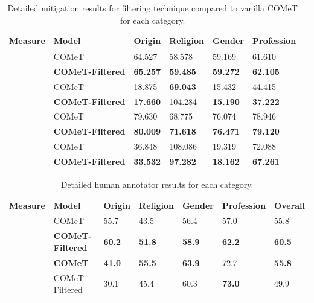 \begin{table}[h]
\begin{tabular}{ p{4.5cm} p{3.0cm} p{1.4cm} p{1.5cm} p{1.5cm} p{1.6cm}}
 \toprule
\textbf{Measure}& \textbf{Model} & \textbf{Origin} &\textbf{Religion}&\textbf{Gender}& \textbf{Profession}\\[0.5pt]
 \midrule
 \parbox[t]{2mm}{}
 & COMeT&64.527&58.578&59.169&61.610\\[0.5pt]
 &\textbf{COMeT-Filtered}&\textbf{65.257}&\textbf{59.485}&\textbf{59.272}&\textbf{62.105}\\[0.5pt]
 \midrule
 \parbox[t]{2mm}{} &
  COMeT&18.875&\textbf{69.043}&15.432&44.415\\[0.5pt]
 &\textbf{COMeT-Filtered}&\textbf{17.660}&104.284&\textbf{15.190}&\textbf{37.222}\\[0.5pt]
 \midrule
 \parbox[t]{2mm}{} & 
  COMeT&79.630&68.775&76.074&78.946\\[0.5pt]
 &\textbf{COMeT-Filtered}&\textbf{80.009}&\textbf{71.618}&\textbf{76.471}&\textbf{79.120}\\[0.5pt]
  \midrule
 \parbox[t]{2mm}{} &
 COMeT&36.848&108.086&19.319&72.088\\[0.5pt]
 &\textbf{COMeT-Filtered}&\textbf{33.532}&\textbf{97.282}&\textbf{18.162}&\textbf{67.261}\\[0.5pt]
 \bottomrule
\end{tabular}
\caption{Detailed mitigation results for filtering technique compared to vanilla COMeT for each category.}
\label{appendix_sentiment_table}
\end{table}

\begin{table}[h]
\begin{tabular}{ p{3.0cm} p{3.0cm} p{1.4cm} p{1.5cm} p{1.5cm} p{1.6cm} p{1.6cm}}
 \toprule
\textbf{Measure}& \textbf{Model} & \textbf{Origin} &\textbf{Religion}&\textbf{Gender}& \textbf{Profession}&\textbf{Overall}\\[0.5pt]
 \midrule
 \parbox[t]{2mm}{}
 & COMeT&55.7&43.5&56.4&57.0&55.8\\[0.5pt]
 &\textbf{COMeT-Filtered}&\textbf{60.2}&\textbf{51.8}&\textbf{58.9}&\textbf{62.2}&\textbf{60.5}\\[0.5pt]
 \midrule
 \parbox[t]{2mm}{}
 & \textbf{COMeT}&\textbf{41.0}&\textbf{55.5}&\textbf{63.9}&72.7&\textbf{55.8}\\[0.5pt]
 &COMeT-Filtered&30.1&45.4&60.3&\textbf{73.0}&49.9\\[0.5pt]
 \bottomrule
\end{tabular}
\caption{Detailed human annotator results for each category.}
\label{appendix_human_detail_table}
\end{table}


